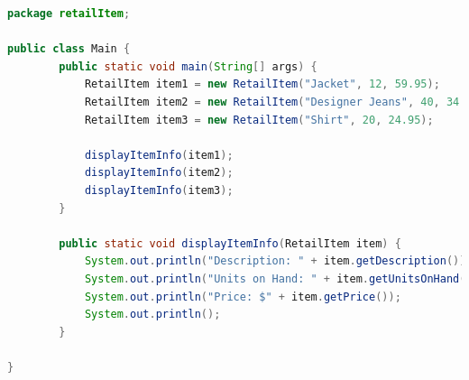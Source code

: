\documentclass{article}
\begin{document}
\begin{lstlisting}[language=Java, caption=Main.java]
package retailItem;

public class Main {
        public static void main(String[] args) {
            RetailItem item1 = new RetailItem("Jacket", 12, 59.95);
            RetailItem item2 = new RetailItem("Designer Jeans", 40, 34.95);
            RetailItem item3 = new RetailItem("Shirt", 20, 24.95);

            displayItemInfo(item1);
            displayItemInfo(item2);
            displayItemInfo(item3);
        }

        public static void displayItemInfo(RetailItem item) {
            System.out.println("Description: " + item.getDescription());
            System.out.println("Units on Hand: " + item.getUnitsOnHand());
            System.out.println("Price: $" + item.getPrice());
            System.out.println();
        }

}

\end{lstlisting}

\end{document}

